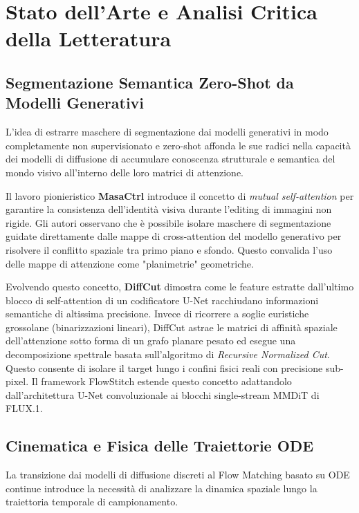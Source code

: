 \documentclass[12pt,a4paper]{report}
\begin{document}
\chapter{Stato dell'Arte e Analisi Critica della Letteratura}

\section{Segmentazione Semantica Zero-Shot da Modelli Generativi}
L'idea di estrarre maschere di segmentazione dai modelli generativi in modo completamente non supervisionato e zero-shot affonda le sue radici nella capacità dei modelli di diffusione di accumulare conoscenza strutturale e semantica del mondo visivo all'interno delle loro matrici di attenzione.

Il lavoro pionieristico \textbf{MasaCtrl} \cite{masactrl2023} introduce il concetto di \textit{mutual self-attention} per garantire la consistenza dell'identità visiva durante l'editing di immagini non rigide. Gli autori osservano che è possibile isolare maschere di segmentazione guidate direttamente dalle mappe di cross-attention del modello generativo per risolvere il conflitto spaziale tra primo piano e sfondo. Questo convalida l'uso delle mappe di attenzione come "planimetrie" geometriche.

Evolvendo questo concetto, \textbf{DiffCut} \cite{diffcut2024} dimostra come le feature estratte dall'ultimo blocco di self-attention di un codificatore U-Net racchiudano informazioni semantiche di altissima precisione. Invece di ricorrere a soglie euristiche grossolane (binarizzazioni lineari), DiffCut astrae le matrici di affinità spaziale dell'attenzione sotto forma di un grafo planare pesato ed esegue una decomposizione spettrale basata sull'algoritmo di \textit{Recursive Normalized Cut}. Questo consente di isolare il target lungo i confini fisici reali con precisione sub-pixel. Il framework FlowStitch estende questo concetto adattandolo dall'architettura U-Net convoluzionale ai blocchi single-stream MMDiT di FLUX.1.

\section{Cinematica e Fisica delle Traiettorie ODE}
La transizione dai modelli di diffusione discreti al Flow Matching basato su ODE continue introduce la necessità di analizzare la dinamica spaziale lungo la traiettoria temporale di campionamento.
\end{document}
